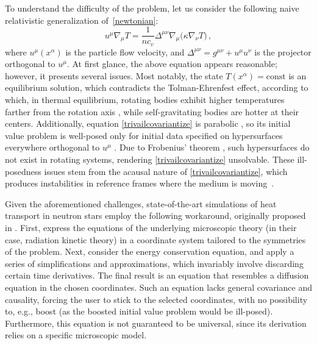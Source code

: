 \documentclass[a4paper, amsfonts, amssymb, amsmath, reprint, showkeys, nofootinbib, twoside, onecolumn,notitlepage]{revtex4-1}
\theoremstyle{definition}
\theoremstyle{theorem}
\begin{document}
To understand the difficulty of the problem, let us consider the following naive relativistic generalization of~\eqref{newtonian}:
\vspace{-0.15cm}
\begin{equation}\label{trivailcovariantize}
u^\mu \nabla_\mu T =\dfrac{1}{nc_v} \Delta^{\mu \nu} \nabla_\mu \big(\kappa \nabla_\nu T\big) \, ,   
\end{equation}
where $u^\mu(x^\alpha)$ is the particle flow velocity, and $\Delta^{\mu \nu}=g^{\mu \nu}{+}u^\mu u^\nu$ is the projector orthogonal to $u^\mu$. At first glance, the above equation appears reasonable; however, it presents several issues. Most notably, the state $T(x^\alpha)=\text{const}$ is an equilibrium solution, which contradicts the Tolman-Ehrenfest effect, according to which, in thermal equilibrium, rotating bodies exhibit higher temperatures farther from the rotation axis \cite[\S 12.5]{cercignani_book}, while self-gravitating bodies are hotter at their centers. Additionally, equation \eqref{trivailcovariantize} is parabolic \cite[\S 7.1]{evansPDEbook}, so its initial value problem is well-posed only for initial data specified on hypersurfaces everywhere orthogonal to $u^\mu$ \cite{Kost2000}. Due to Frobenius' theorem \cite[\S B.3]{Wald}, such hypersurfaces do not exist in rotating systems, rendering \eqref{trivailcovariantize} unsolvable. These ill-posedness issues stem from the acausal nature of \eqref{trivailcovariantize}, which produces instabilities in reference frames where the medium is moving~\cite{Hiscock_Insatibility_first_order,GavassinoLyapunov_2020,GavassinoSuperlum2021,GavassinoBounds2023myj}.


Given the aforementioned challenges, state-of-the-art simulations of heat transport in neutron stars \cite{Schaab:1998ed,Negreiros2012,Yakovlev:2004iq,Potekhin:2015qsa,Beznogov:2022wae} employ the following workaround, originally proposed in \cite{Miralles1993}. First, express the equations of the underlying microscopic theory (in their case, radiation kinetic theory) in a coordinate system tailored to the symmetries of the problem. Next, consider the energy conservation equation, and apply a series of simplifications and approximations, which invariably involve discarding certain time derivatives. The final result is an equation that resembles a diffusion equation in the chosen coordinates. Such an equation lacks general covariance and causality, forcing the user to stick to the selected coordinates, with no possibility to, e.g., boost (as the boosted initial value problem would be ill-posed). Furthermore, this equation is not guaranteed to be universal, since its derivation relies on a specific microscopic model. 
\end{document}
